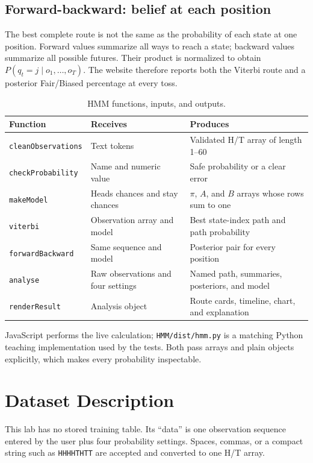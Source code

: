 \documentclass[12pt,a4paper,openany]{report}
\newcommand{\sourcepath}[1]{\texttt{#1}}
\begin{document}
\subsection{Forward-backward: belief at each position}
The best complete route is not the same as the probability of each state at
one position. Forward values summarize all ways to reach a state; backward
values summarize all possible futures. Their product is normalized to obtain
$P(q_t=j\mid o_1,\ldots,o_T)$. The website therefore reports both the Viterbi
route and a posterior Fair/Biased percentage at every toss.

\begin{table}[H]
\centering
\caption{HMM functions, inputs, and outputs.}
\begin{tabularx}{\textwidth}{p{}YY}
\toprule
\textbf{Function} & \textbf{Receives} & \textbf{Produces} \\
\midrule
\texttt{cleanObservations} & Text tokens & Validated H/T array of length 1--60 \\
\texttt{checkProbability} & Name and numeric value & Safe probability or a clear error \\
\texttt{makeModel} & Heads chances and stay chances & $\pi$, $A$, and $B$ arrays whose rows sum to one \\
\texttt{viterbi} & Observation array and model & Best state-index path and path probability \\
\texttt{forwardBackward} & Same sequence and model & Posterior pair for every position \\
\texttt{analyse} & Raw observations and four settings & Named path, summaries, posteriors, and model \\
\texttt{renderResult} & Analysis object & Route cards, timeline, chart, and explanation \\
\bottomrule
\end{tabularx}
\end{table}

JavaScript performs the live calculation; \sourcepath{HMM/dist/hmm.py} is a
matching Python teaching implementation used by the tests. Both pass arrays and
plain objects explicitly, which makes every probability inspectable.

\section{Dataset Description}
This lab has no stored training table. Its ``data'' is one observation sequence
entered by the user plus four probability settings. Spaces, commas, or a compact
string such as \texttt{HHHHTHTT} are accepted and converted to one H/T array.
\end{document}
